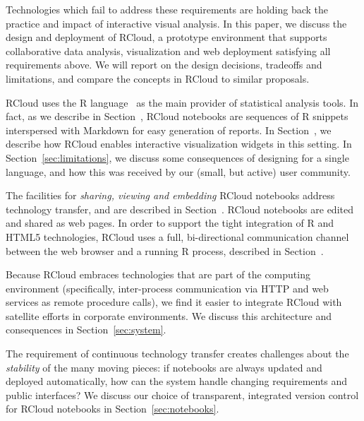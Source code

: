 Technologies which fail to address these requirements
are holding back the practice and impact of interactive visual
analysis. In this paper, we discuss the design and deployment of
RCloud, a prototype environment that supports collaborative data
analysis, visualization and web deployment satisfying all requirements
above. We will report on the design decisions, tradeoffs and
limitations, and compare the concepts in RCloud to similar proposals.

RCloud uses the R language~\cite{RCoreTeam:2013:R} as the main provider of
statistical analysis tools. In fact, as we describe in
Section~, RCloud notebooks are sequences of R snippets
interspersed with Markdown for easy generation of reports. In
Section~, we describe how RCloud enables
interactive visualization widgets in this setting. In
Section~\ref{sec:limitations}, we discuss some consequences of
designing for a single language, and how this was received by
our (small, but active) user community.

%



The facilities for \emph{sharing, viewing and embedding} RCloud
notebooks address technology transfer, and are described in
Section~. RCloud notebooks are edited and shared as web
pages. In order to support the tight integration of R and HTML5
technologies, RCloud uses a full, bi-directional communication channel
between the web browser and a running R process, described in
Section~.

Because RCloud embraces technologies that are part of the computing
environment (specifically, inter-process communication via HTTP and
web services as remote procedure calls), we find it easier to
integrate RCloud with satellite efforts in corporate environments. We
discuss this architecture and consequences in
Section~\ref{sec:system}.

The requirement of continuous technology transfer creates challenges
about the \emph{stability} of the many moving pieces: if notebooks are
always updated and deployed automatically, how can the system handle
changing requirements and public interfaces? We discuss our choice of
transparent, integrated version control for RCloud notebooks in 
Section~\ref{sec:notebooks}.

